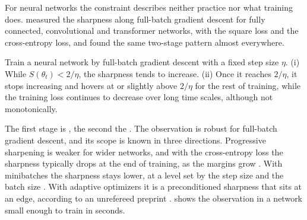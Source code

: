 \begin{refsection}
For neural networks the constraint describes neither practice nor what training does. \Textcite{CohenEtAl2021} measured the sharpness along full-batch gradient descent for fully connected, convolutional and transformer networks, with the square loss and the cross-entropy loss, and found the same two-stage pattern almost everywhere.

\begin{observation}\label{obs:stability:eos}
Train a neural network by full-batch gradient descent with a fixed step size $\eta$. (i) While $S(\theta_t)<2/\eta$, the sharpness tends to increase. (ii) Once it reaches $2/\eta$, it stops increasing and hovers at or slightly above $2/\eta$ for the rest of training, while the training loss continues to decrease over long time scales, although not monotonically.
\end{observation}

The first stage is , the second the . The observation is robust for full-batch gradient descent, and its scope is known in three directions. Progressive sharpening is weaker for wider networks, and with the cross-entropy loss the sharpness typically drops at the end of training, as the margins grow \parencite{CohenEtAl2021}. With minibatches the sharpness stays lower, at a level set by the step size and the batch size \parencite{JastrzebskiEtAl2019,JastrzebskiEtAl2020}. With adaptive optimizers it is a preconditioned sharpness that sits at an edge, according to an unrefereed preprint \parencite{CohenEtAl2022}.  shows the observation in a network small enough to train in seconds.


\end{refsection}
